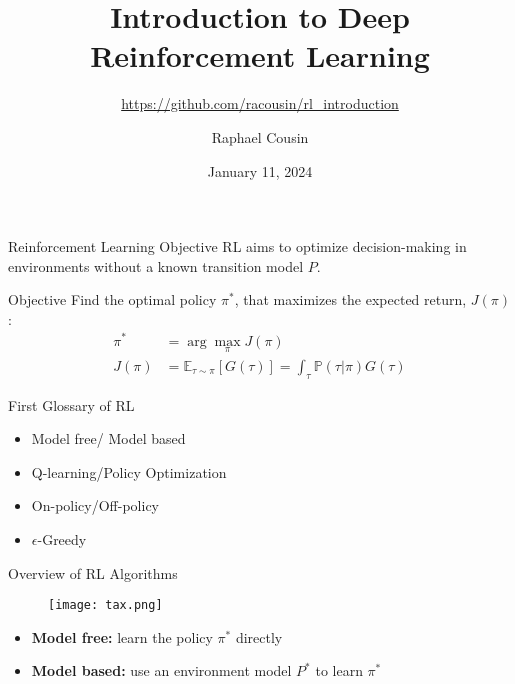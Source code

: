 \documentclass{beamer}
\title[]{Introduction to Deep Reinforcement Learning}
\subtitle{
\url{https://github.com/racousin/rl_introduction}}
\author{Raphael Cousin}
\date{January 11, 2024}
\begin{document}
\begin{frame}
  \titlepage
\end{frame}
\begin{frame}{Reinforcement Learning Objective}
RL aims to optimize decision-making in environments without a known transition model $P$.

\begin{block}{Objective}
Find the optimal policy $\pi^*$, that maximizes the expected return, $J(\pi)$:
\begin{align*}
\pi^* &= \arg\max_{\pi} J(\pi)\\
J(\pi) &= \mathbb{E}_{\tau\sim\pi}[G(\tau)] = \int_{\tau} \mathbb{P}(\tau|\pi) G(\tau)
\end{align*}
\end{block}

\end{frame}

\begin{frame}{First Glossary of RL}
    \begin{itemize}
        \item Model free/ Model based
        \item Q-learning/Policy Optimization
        \item On-policy/Off-policy
        \item $\epsilon$-Greedy
    \end{itemize}
\end{frame}


\begin{frame}{Overview of RL Algorithms}

        \begin{figure}
        \centering
        \texttt{[image: tax.png]}
    \end{figure}
    \begin{block}{}
    \begin{itemize}
    \item \textbf{Model free:} learn the policy $\pi^*$ directly
    \item  \textbf{Model based:} use an environment model $P^*$ to learn $\pi^*$
\end{itemize}
\end{block}

\end{frame}
\end{document}
